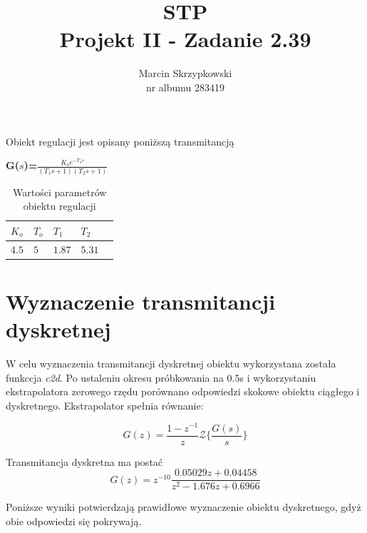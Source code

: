 \documentclass[fleqn]{article}
\title{\textbf{STP} \\ \large Projekt II - Zadanie 2.39}
\author{Marcin Skrzypkowski \\ nr albumu 283419}
\begin{document}
\maketitle

\setcounter{page}{0}
\thispagestyle{empty}

\pagebreak
\setcounter{page}{1}


\tableofcontents
\pagebreak


\begin{center}

	Obiekt regulacji jest opisany poniższą transmitancją

	\Large{\textbf{G($s$)=}$\frac{K_oe^{-T_os}}{(T_1s+1)(T_2s+1)}$}
\end{center}

\begin{table}[H]
	\centering
	\label{my-label}
	\begin{tabular}{|l|l|l|l|l|}\hline
		$K_o$ & $T_o$ &$T_1$ &  $T_2$   \\ \hline
		$4.5$ & $5$ & $1.87$ &$5.31$\\ \hline
	\end{tabular}
	\caption{Wartości parametrów obiektu regulacji}
\end{table}

\section{Wyznaczenie transmitancji dyskretnej}

W celu wyznaczenia transmitancji dyskretnej obiektu wykorzystana została funkccja \textit{c2d}. Po ustaleniu okresu próbkowania na $0.5$s i wykorzystaniu ekstrapolatora zerowego rzędu porównano odpowiedzi skokowe obiektu ciągłego i dyskretnego. Ekstrapolator spełnia równanie:
{\Large
\begin{equation}
	G(z)=\frac{1-z^{-1}}{z}\mathcal{Z}\bigg\{\frac{G(s)}{s}\bigg\}
\end{equation}

}

Transmitancja dyskretna ma postać
{\Large
\begin{equation}
	G(z)=z^{-10}\frac{0.05029z+0.04458}{z^2-1.676z+0.6966}
\end{equation}
}

Poniższe wyniki potwierdzają prawidłowe wyznaczenie obiektu dyskretnego, gdyż obie odpowiedzi się pokrywają.
\end{document}
